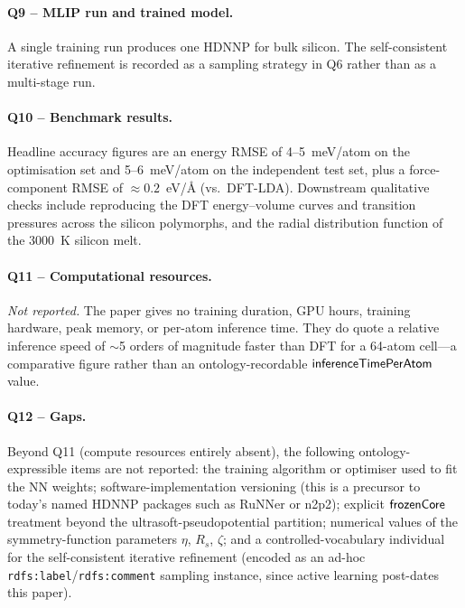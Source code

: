 \paragraph{Q9 -- MLIP run and trained model.}
A single training run produces one HDNNP for bulk silicon. The
self-consistent iterative refinement is recorded as a sampling
strategy in Q6 rather than as a multi-stage run.


\paragraph{Q10 -- Benchmark results.}
Headline accuracy figures are an energy RMSE of 4--5~meV/atom
on the optimisation set and 5--6~meV/atom on the independent test
set, plus a force-component RMSE of $\approx 0.2$~eV/\AA{} (vs.\
DFT-LDA). Downstream qualitative checks include reproducing the
DFT energy--volume curves and transition pressures across the
silicon polymorphs, and the radial distribution function of the
3000~K silicon melt.


\paragraph{Q11 -- Computational resources.}
\emph{Not reported.} The paper gives no training duration, GPU
hours, training hardware, peak memory, or per-atom inference
time. They do quote a relative inference speed of $\sim$5 orders
of magnitude faster than DFT for a 64-atom cell---a comparative
figure rather than an ontology-recordable
$\mathsf{inferenceTimePerAtom}$ value.


\paragraph{Q12 -- Gaps.}
Beyond Q11 (compute resources entirely absent), the following
ontology-expressible items are not reported: the training
algorithm or optimiser used to fit the NN weights;
software-implementation versioning (this is a precursor to
today's named HDNNP packages such as RuNNer or n2p2); explicit
$\mathsf{frozenCore}$ treatment beyond the ultrasoft-pseudopotential
partition; numerical values of the symmetry-function parameters
$\eta$, $R_s$, $\zeta$; and a controlled-vocabulary individual
for the self-consistent iterative refinement (encoded as an
ad-hoc \texttt{rdfs:label}/\texttt{rdfs:comment} sampling
instance, since active learning post-dates this paper).
